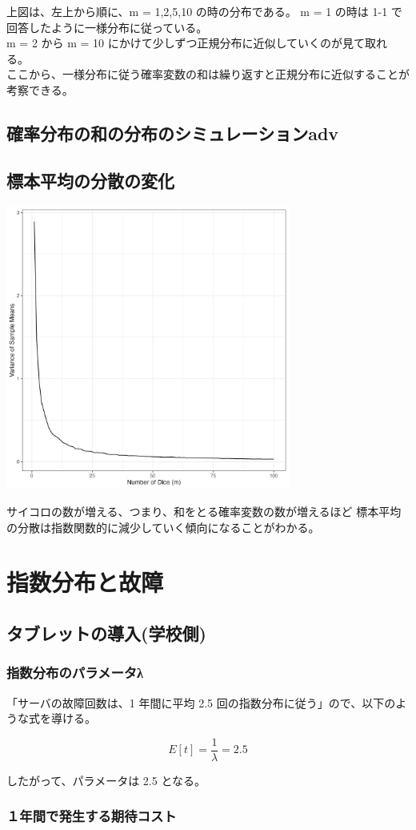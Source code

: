 \documentclass{article}
\begin{document}
上図は、左上から順に、m = 1,2,5,10 の時の分布である。 
m = 1 の時は 1-1 で回答したように一様分布に従っている。\\
m = 2 から m = 10 にかけて少しずつ正規分布に近似していくのが見て取れる。\\
ここから、一様分布に従う確率変数の和は繰り返すと正規分布に近似することが考察できる。

\subsection{確率分布の和の分布のシミュレーションadv}

\subsection{標本平均の分散の変化}
	\begin{center}
		\includegraphics[width=0.7\textwidth]{1-4_plot.png}
	\end{center}

サイコロの数が増える、つまり、和をとる確率変数の数が増えるほど
標本平均の分散は指数関数的に減少していく傾向になることがわかる。

\section{指数分布と故障}
\subsection{タブレットの導入(学校側)}
\subsubsection{指数分布のパラメータλ}

「サーバの故障回数は、1 年間に平均 2.5 回の指数分布に従う」ので、以下のような式を導ける。

\[ E[t] = \frac{1}{\lambda} = 2.5 \]

したがって、パラメータ\lambda は 2.5 となる。

\subsubsection{１年間で発生する期待コスト}
\end{document}
